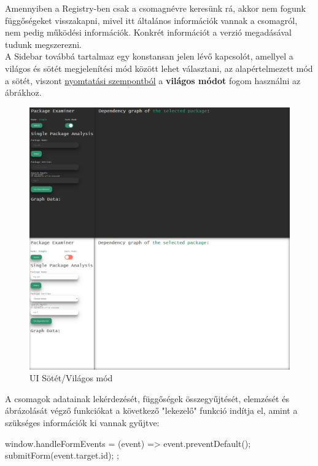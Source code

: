 Amennyiben a Registry-ben csak a csomagnévre keresünk rá, akkor nem fogunk függőségeket visszakapni, mivel itt általános információk vannak a csomagról, nem pedig működési információk. Konkrét információt a verzió megadásával tudunk megszerezni.\\

A Sidebar továbbá tartalmaz egy konstansan jelen lévő kapcsolót, amellyel a világos és sötét megjelenítési mód között lehet választani, az alapértelmezett mód a sötét, viszont \underline{nyomtatási szempontból} a \textbf{világos módot} fogom használni az ábrákhoz. 

\begin{figure}[!h]
	\centering
	\includegraphics[scale=0.15]{images/ui_darkmode.png}
	\caption{UI Sötét/Világos mód}
	\label{fig:ui_darkmode}
\end{figure}

A csomagok adatainak lekérdezését, függőségek összegyűjtését, elemzését és ábrázolását végző funkciókat a következő "lekezelő" funkció indítja el, amint a szükséges információk ki vannak gyűjtve:

\begin{js}
window.handleFormEvents = (event) => {
	event.preventDefault();
	submitForm(event.target.id);
};
\end{js}

